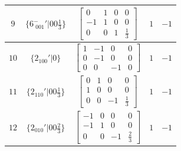 \documentclass[fleqn,8pt]{jsarticle}
\begin{document}
\begin{longtable}{ccccc}
$ 9 $ & $ \{6^{-}_{\,\,001}{}'|0 0 \frac{1}{3}\} $ & $ \begin{bmatrix} 0 & 1 & 0 & 0 \\ -1 & 1 & 0 & 0 \\ 0 & 0 & 1 & \frac{1}{3} \end{bmatrix} $ & $ 1 $ & $ -1 $ \\ \hline
$ 10 $ & $ \{2{}_{100}{}'|0\} $ & $ \begin{bmatrix} 1 & -1 & 0 & 0 \\ 0 & -1 & 0 & 0 \\ 0 & 0 & -1 & 0 \end{bmatrix} $ & $ 1 $ & $ -1 $ \\ \hline
$ 11 $ & $ \{2{}_{110}{}'|0 0 \frac{1}{3}\} $ & $ \begin{bmatrix} 0 & 1 & 0 & 0 \\ 1 & 0 & 0 & 0 \\ 0 & 0 & -1 & \frac{1}{3} \end{bmatrix} $ & $ 1 $ & $ -1 $ \\ \hline
$ 12 $ & $ \{2{}_{010}{}'|0 0 \frac{2}{3}\} $ & $ \begin{bmatrix} -1 & 0 & 0 & 0 \\ -1 & 1 & 0 & 0 \\ 0 & 0 & -1 & \frac{2}{3} \end{bmatrix} $ & $ 1 $ & $ -1 $ \\
\end{longtable}
\end{document}
